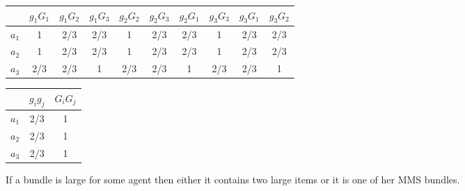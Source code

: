 
\begin{figure}
\centering
\begin{tabular}{c|c c c c c c c c c}
     & $g_1G_1$ & $g_1G_2$ & $g_1G_3$ & $g_2G_2$ & $g_2G_3$ & $g_2G_1$ & $g_3G_3$ & $g_3G_1$ & $g_3G_2$ \\
     \hline
     $a_1$ & 1 &  2/3 &  2/3 & 1 &  2/3 &  2/3 & 1 &  2/3 &  2/3\\
     $a_2$ & 1 &  2/3 &  2/3 & 1 &  2/3 &  2/3 & 1 &  2/3 &  2/3 \\
     $a_3$ & 2/3 & 2/3 & 1 & 2/3 & 2/3 & 1 & 2/3 & 2/3 & 1 
     
\end{tabular}


\begin{tabular}{c|c c}
    & $g_ig_j$ & $G_iG_j$ \\
    \hline
    $a_1$ & 2/3 & 1 \\
    $a_2$ & 2/3 & 1 \\
    $a_3$ & 2/3 & 1
\end{tabular}
    \caption{If a bundle is large for some agent then either it contains two large items or it is one of her MMS bundles.}
    \label{fig:sizetwo}
\end{figure}





